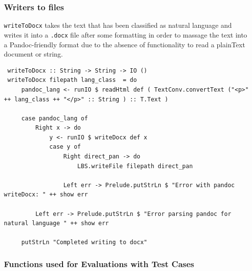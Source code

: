 \documentclass[12pt]{scrreprt}
\begin{document}
\subsubsection{Writers to files}
\texttt{writeToDocx} takes the text that has been classified as natural language and writes it into a \texttt{.docx} file after some formatting in order to massage the text into a Pandoc-friendly format due to the absence of functionality to read a plainText document or string.

\begin{verbatim}
 writeToDocx :: String -> String -> IO ()
 writeToDocx filepath lang_class  = do
     pandoc_lang <- runIO $ readHtml def ( TextConv.convertText ("<p>" ++ lang_class ++ "</p>" :: String ) :: T.Text )
 
     case pandoc_lang of
         Right x -> do
             y <- runIO $ writeDocx def x
             case y of
                 Right direct_pan -> do
                     LBS.writeFile filepath direct_pan
 
                 Left err -> Prelude.putStrLn $ "Error with pandoc writeDocx: " ++ show err
 
         Left err -> Prelude.putStrLn $ "Error parsing pandoc for natural language " ++ show err
 
     putStrLn "Completed writing to docx"
\end{verbatim}


\subsubsection{Functions used for Evaluations with Test Cases}
\end{document}
